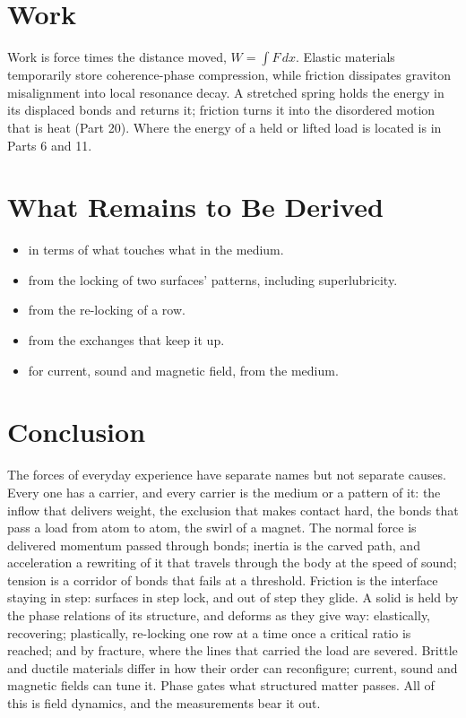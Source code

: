 \section{Work}

Work is force times the distance moved, $W=\int F\,dx$. Elastic materials temporarily store coherence-phase compression, while friction dissipates graviton misalignment into local resonance decay. A stretched spring holds the energy in its displaced bonds and returns it; friction turns it into the disordered motion that is heat (Part 20). Where the energy of a held or lifted load is located is in Parts 6 and 11.

\section{What Remains to Be Derived}

\begin{itemize}
\item {} in terms of what touches what in the medium.
\item {} from the locking of two surfaces' patterns, including superlubricity.
\item {} from the re-locking of a row.
\item {} from the exchanges that keep it up.
\item {} for current, sound and magnetic field, from the medium.
\end{itemize}

\section*{Conclusion}

The forces of everyday experience have separate names but not separate causes. Every one has a carrier, and every carrier is the medium or a pattern of it: the inflow that delivers weight, the exclusion that makes contact hard, the bonds that pass a load from atom to atom, the swirl of a magnet. The normal force is delivered momentum passed through bonds; inertia is the carved path, and acceleration a rewriting of it that travels through the body at the speed of sound; tension is a corridor of bonds that fails at a threshold. Friction is the interface staying in step: surfaces in step lock, and out of step they glide. A solid is held by the phase relations of its structure, and deforms as they give way: elastically, recovering; plastically, re-locking one row at a time once a critical ratio is reached; and by fracture, where the lines that carried the load are severed. Brittle and ductile materials differ in how their order can reconfigure; current, sound and magnetic fields can tune it. Phase gates what structured matter passes. All of this is field dynamics, and the measurements bear it out.

